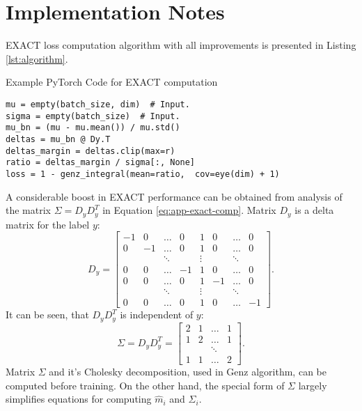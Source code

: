 \documentclass[nohyperref]{article}
\theoremstyle{plain}
\theoremstyle{definition}
\theoremstyle{remark}
\begin{document}
\section{Implementation Notes}
EXACT loss computation algorithm with all improvements is presented in Listing \ref{lst:algorithm}.



\begin{listing}[h]\caption{Example PyTorch Code for EXACT computation}\label{lst:algorithm}\begin{lstlisting}
mu = empty(batch_size, dim)  # Input.
sigma = empty(batch_size)  # Input.
mu_bn = (mu - mu.mean()) / mu.std()
deltas = mu_bn @ Dy.T
deltas_margin = deltas.clip(max=r)
ratio = deltas_margin / sigma[:, None]
loss = 1 - genz_integral(mean=ratio,  cov=eye(dim) + 1)
\end{lstlisting}
\end{listing}


A considerable boost in EXACT performance can be obtained from analysis of the matrix $\Sigma = D_yD_y^T$ in Equation \ref{eq:app-exact-comp}. Matrix $D_y$ is a delta matrix for the label $y$:
\begin{equation}
D_y = \begin{bmatrix}
  -1 & 0 & \dots & 0 & 1 & 0 & \dots & 0 \\
  0 & -1 & \dots & 0 & 1 & 0 & \dots & 0 \\
  & & \ddots & & \vdots & & \ddots & \\
  0 & 0 & \dots & -1 & 1 & 0 & \dots & 0 \\
  0 & 0 & \dots & 0 & 1 & -1 & \dots & 0 \\
  & & \ddots & & \vdots & & \ddots & \\
  0 & 0 & \dots & 0 & 1 & 0 & \dots & -1
\end{bmatrix}.
\end{equation}
It can be seen, that $D_yD_y^T$ is independent of $y$:
\begin{equation}
\Sigma = D_yD_y^T = \begin{bmatrix}
  2 & 1 & \dots & 1 \\
  1 & 2 & \dots & 1 \\
    &   & \ddots & \\
  1 & 1 & \dots & 2
\label{eq:app-sigma}
\end{bmatrix}.
\end{equation}
Matrix $\Sigma$ and it's Cholesky decomposition, used in Genz algorithm, can be computed before training. On the other hand, the special form of $\Sigma$ largely simplifies equations for computing $\hat m_i$ and $\hat \Sigma_i$.
\end{document}
